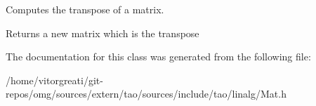 Computes the transpose of a matrix. 

\begin{DoxyReturn}{Returns}
a new matrix which is the transpose 
\end{DoxyReturn}


The documentation for this class was generated from the following file\+:\begin{DoxyCompactItemize}
\item 
/home/vitorgreati/git-\/repos/omg/sources/extern/tao/sources/include/tao/linalg/Mat.\+h\end{DoxyCompactItemize}
